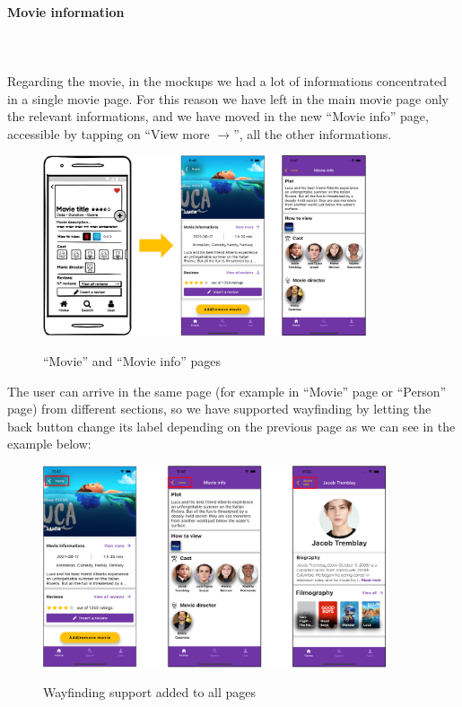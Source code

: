 \documentclass[12pt, a4paper]{article}
\numberwithin{figure}{section}
\begin{document}
\paragraph{Movie information}
\mbox{}\\\\
Regarding the movie, in the mockups we had a lot of informations concentrated in a single movie page. For this reason
we have left in the main movie page only the relevant informations, and we have moved in the new “Movie info” page, accessible
by tapping on “View more $\rightarrow$”, all the other informations.\\

\begin{figure}[H]
	\centering
	\includegraphics[width=0.85\textwidth]{images/prototype1/movieInfo.png}\\
	\caption{“Movie” and “Movie info” pages}
\end{figure}

\noindent
The user can arrive in the same page (for example in “Movie” page or “Person” page) from different sections,
so we have supported wayfinding by letting the back button change its label depending on the previous page as
we can see in the example below:
\begin{figure}[H]
	\centering
	\includegraphics[width=0.9\textwidth]{images/prototype1/wayfinding.png}\\
	\caption{Wayfinding support added to all pages}
\end{figure}
\end{document}
